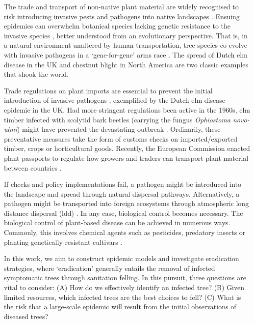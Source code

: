 The trade and transport of non-native plant material are widely recognised to risk introducing invasive pests and pathogens into native landscapes \cite{POTTER201761, lovett2016nonnative, roy2014increasing}.
Ensuing epidemics can overwhelm botanical species lacking genetic resistance to the invasive species \cite{desprez2016evolutionary}, better understood from an evolutionary perspective. That is, in a natural environment unaltered by human transportation, tree species co-evolve with invasive pathogens in a `gene-for-gene' arms race \cite{Thrall1735, dangl2001plant, flor1971current}.
The spread of Dutch elm disease in the UK \cite{doi:10.1111/j.1365-3059.2010.02391.x} and chestnut blight
in North America \cite{doi:10.1002/9780470535486.ch7} are two classic examples that shook the world.


Trade regulations on plant imports are essential to prevent the initial introduction of invasive pathogens \cite{rodoni2009role}, exemplified by the Dutch elm disease epidemic in the UK. 
Had more stringent regulations been active in the 1960s, elm timber infected with scolytid bark beetles (carrying the fungus \textit{Ophiostoma novo‐ulmi}) might have prevented the devastating outbreak \cite{doi:10.1111/j.1365-3059.2010.02391.x}. 
Ordinarily, these preventative measures take the form of customs checks on imported/exported timber, crops or horticultural goods. 
Recently, the European Commission enacted plant passports to regulate how growers and traders can transport plant material between countries \cite{wulfert2010implementation}.

If checks and policy implementations fail, a pathogen might be introduced into the landscape and spread through natural
dispersal pathways. Alternatively, a pathogen might be transported into foreign ecosystems through atmospheric 
long distance dispersal (\acrshort{ldd}) \cite{brown2002aerial}. In any case, biological control becomes necessary. 
The biological control of plant-based disease
can be achieved in numerous ways. Commonly, this involves chemical agents such as pesticides, predatory insects or planting
genetically resistant cultivars \cite{pal2006biological, baker1974biological}. 

In this work, we aim to construct epidemic models and investigate eradication strategies, 
where `eradication' generally entails the removal of infected symptomatic trees through sanitation felling. 
In this pursuit, three questions are vital to consider: 
(A) How do we effectively identify an infected tree? 
(B) Given limited resources, which infected trees are the best choices to fell? 
(C) What is the risk that a large-scale epidemic will result from the initial observations of diseased trees?

